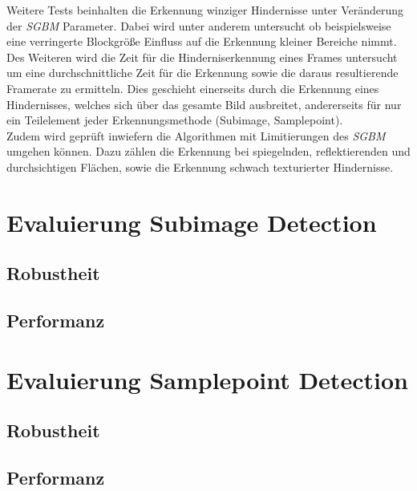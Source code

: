 \noindent
Weitere Tests beinhalten die Erkennung winziger Hindernisse unter Veränderung der \emph{SGBM} Parameter. Dabei wird unter anderem untersucht ob beispielsweise eine verringerte Blockgröße Einfluss auf die Erkennung kleiner Bereiche nimmt. Des Weiteren wird die Zeit für die Hinderniserkennung eines Frames untersucht um eine durchschnittliche Zeit für die Erkennung sowie die daraus resultierende Framerate zu ermitteln. Dies geschieht einerseits durch die Erkennung eines Hindernisses, welches sich über das gesamte Bild ausbreitet, andererseits für nur ein Teilelement jeder Erkennungsmethode (Subimage, Samplepoint).\\
Zudem wird geprüft inwiefern die Algorithmen mit Limitierungen des \emph{SGBM} umgehen können. Dazu zählen die Erkennung bei spiegelnden, reflektierenden und durchsichtigen Flächen, sowie die Erkennung schwach texturierter Hindernisse.\\



\section{Evaluierung Subimage Detection}
\label{sec:evaluierung_subimage}

    \subsection{Robustheit}
    \label{subsec:subimage_robustheit}

    \subsection{Performanz}
    \label{subsec:subimage_performanz}

\section{Evaluierung Samplepoint Detection}
\label{sec:evaluierung_samplepoint}

    \subsection{Robustheit}
    \label{subsec:samplepoint_robustheit}    

    \subsection{Performanz}
    \label{subsec:samplepoint_performanz}